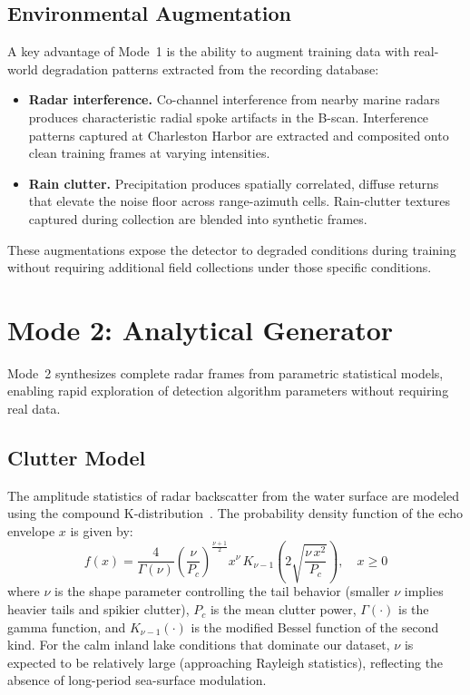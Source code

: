 \documentclass[twocolumn, 10pt]{article}
\begin{document}
\subsection{Environmental Augmentation}

A key advantage of Mode~1 is the ability to augment training data with real-world degradation patterns extracted from the recording database:

\begin{itemize}
    \item \textbf{Radar interference.} Co-channel interference from nearby marine radars produces characteristic radial spoke artifacts in the B-scan. Interference patterns captured at Charleston Harbor are extracted and composited onto clean training frames at varying intensities.
    \item \textbf{Rain clutter.} Precipitation produces spatially correlated, diffuse returns that elevate the noise floor across range-azimuth cells. Rain-clutter textures captured during collection are blended into synthetic frames.
\end{itemize}

These augmentations expose the detector to degraded conditions during training without requiring additional field collections under those specific conditions.

\section{Mode 2: Analytical Generator}
\label{sec:mode2}

Mode~2 synthesizes complete radar frames from parametric statistical models, enabling rapid exploration of detection algorithm parameters without requiring real data.

\subsection{Clutter Model}

The amplitude statistics of radar backscatter from the water surface are modeled using the compound K-distribution~\cite{ward2013sea, watts1987radar}. The probability density function of the echo envelope $x$ is given by:
\begin{equation}
f(x) = \frac{4}{\Gamma(\nu)} \left(\frac{\nu}{P_c}\right)^{\!\frac{\nu+1}{2}} x^{\nu}\, K_{\nu-1}\!\left(2\sqrt{\frac{\nu\, x^2}{P_c}}\right), \quad x \geq 0
\label{eq:kdist}
\end{equation}
where $\nu$ is the shape parameter controlling the tail behavior (smaller $\nu$ implies heavier tails and spikier clutter), $P_c$ is the mean clutter power, $\Gamma(\cdot)$ is the gamma function, and $K_{\nu-1}(\cdot)$ is the modified Bessel function of the second kind. For the calm inland lake conditions that dominate our dataset, $\nu$ is expected to be relatively large (approaching Rayleigh statistics), reflecting the absence of long-period sea-surface modulation.
\end{document}
